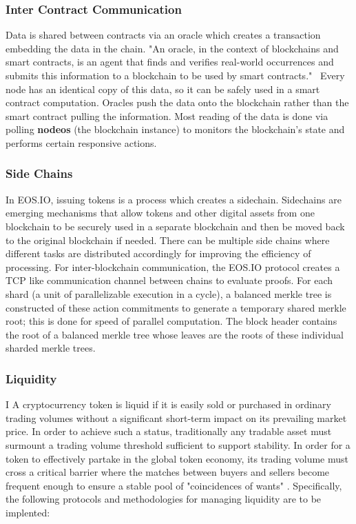 \documentclass[]{article}
\begin{document}
{\begin{enumerate}
		
\end{enumerate}
	 
	\subsubsection{Inter Contract Communication}
	Data is shared between contracts via an oracle which creates a transaction embedding the data in the chain. 
	"An oracle, in the context of blockchains and smart contracts, is an agent that finds and verifies real-world occurrences 
	and submits this information to a blockchain to be used by smart contracts."\ 
	\cite{2}
	Every node has an identical copy of this data, so it can be safely used in a smart contract computation.
	Oracles push the data onto the blockchain rather than the smart contract pulling the information.
	Most reading of the data is done via polling \textbf{nodeos} (the blockchain instance) to monitors the blockchain's state 
	and performs certain responsive actions. 
	
	
	\subsubsection{Side Chains}
	In EOS.IO, issuing tokens is a process which creates a sidechain. 
	Sidechains are emerging mechanisms that allow tokens and other digital assets from one blockchain 
	to be securely used in a separate blockchain and then be moved back to the original blockchain if needed. 
	There can be multiple side chains where different tasks are distributed accordingly for improving the efficiency of processing. 	
	For inter-blockchain communication, the EOS.IO protocol creates a TCP like communication channel between chains to evaluate proofs.
	For each shard (a unit of parallelizable execution in a cycle), a balanced merkle tree is constructed of these action commitments 
	to generate a temporary shared merkle root; 
	this is done for speed of parallel computation. 
	The block header contains the root of a balanced merkle tree whose leaves are the roots of these individual sharded merkle trees.
	\cite{3} 

	
	\subsubsection{Liquidity}
	I
	 A cryptocurrency token is liquid if it is easily sold or purchased in ordinary trading volumes without a significant short-term impact on its prevailing market price. In order to achieve such a status, traditionally any tradable asset must surmount a trading volume threshold sufficient to support stability. 
	In order for a token to effectively partake in the global token economy, its trading volume must cross a critical barrier where
	the matches between buyers and sellers become frequent enough to ensure a stable pool of "coincidences of wants" \cite{10}. 
    Specifically, the following protocols and methodologies for managing liquidity are to be implented: 
    
}
\end{document}
